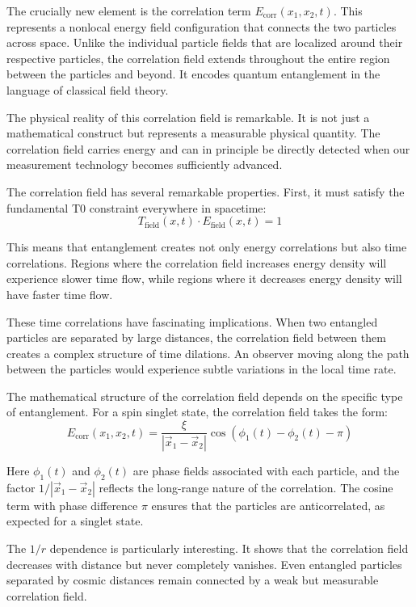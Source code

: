 \documentclass[12pt,a4paper]{article}
\newcommand{\xipar}{\xi}
\theoremstyle{definition}
\theoremstyle{remark}
\begin{document}
The crucially new element is the correlation term $E_{\text{corr}}(x_1,x_2,t)$. This represents a nonlocal energy field configuration that connects the two particles across space. Unlike the individual particle fields that are localized around their respective particles, the correlation field extends throughout the entire region between the particles and beyond. It encodes quantum entanglement in the language of classical field theory.

The physical reality of this correlation field is remarkable. It is not just a mathematical construct but represents a measurable physical quantity. The correlation field carries energy and can in principle be directly detected when our measurement technology becomes sufficiently advanced.

The correlation field has several remarkable properties. First, it must satisfy the fundamental T0 constraint everywhere in spacetime:
$$T_{\text{field}}(x,t) \cdot E_{\text{field}}(x,t) = 1$$

This means that entanglement creates not only energy correlations but also time correlations. Regions where the correlation field increases energy density will experience slower time flow, while regions where it decreases energy density will have faster time flow.

These time correlations have fascinating implications. When two entangled particles are separated by large distances, the correlation field between them creates a complex structure of time dilations. An observer moving along the path between the particles would experience subtle variations in the local time rate.

The mathematical structure of the correlation field depends on the specific type of entanglement. For a spin singlet state, the correlation field takes the form:
\begin{equation}
	E_{\text{corr}}(x_1,x_2,t) = \frac{\xipar}{|\vec{x}_1 - \vec{x}_2|} \cos(\phi_1(t) - \phi_2(t) - \pi)
	\label{eq:singlet_correlation}
\end{equation}

Here $\phi_1(t)$ and $\phi_2(t)$ are phase fields associated with each particle, and the factor $1/|\vec{x}_1 - \vec{x}_2|$ reflects the long-range nature of the correlation. The cosine term with phase difference $\pi$ ensures that the particles are anticorrelated, as expected for a singlet state.

The $1/r$ dependence is particularly interesting. It shows that the correlation field decreases with distance but never completely vanishes. Even entangled particles separated by cosmic distances remain connected by a weak but measurable correlation field.
\end{document}
